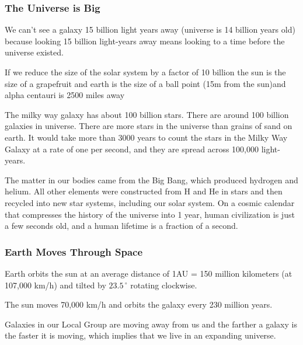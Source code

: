 \subsubsection{The Universe is Big}
We can't see a galaxy 15 billion light years away (universe is 14 billion years old) because looking 15 billion light-years away means looking to a time before the universe existed.

If we reduce the size of the solar system by a factor of 10 billion the sun is the size of a grapefruit and earth is the size of a ball point (15m from the sun)and alpha centauri is 2500 miles away

The milky way galaxy has about 100 billion stars. There are around 100 billion galaxies in universe. There are more stars in the universe than grains of sand on earth. It would take more than 3000 years to count the stars in the Milky Way Galaxy at a rate of one per second, and they are spread across 100,000 light-years.

The matter in our bodies came from the Big  Bang, which produced hydrogen and helium. All other elements were constructed from H  and He in stars and then recycled into new  star systems, including our solar system. On a cosmic calendar that compresses the history of the universe into 1 year, human civilization is just a few seconds old, and a human lifetime is a fraction of a second.

\subsubsection{Earth Moves Through Space}
Earth orbits the sun at an average distance of 1AU = 150 million kilometers (at 107,000 km/h) and tilted by $23.5\,^{\circ}$ rotating clockwise.

The sun moves 70,000 km/h and orbits the galaxy every 230 million years.

Galaxies in our Local Group are moving away from us and the farther a galaxy is the faster it is moving, which implies that we live in an expanding universe.

